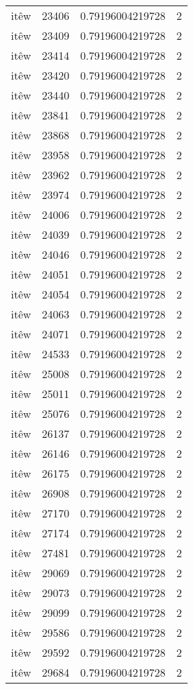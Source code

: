 \begin{longtable}{llll}
itêw & 23406 & 0.79196004219728 & 2\\
itêw & 23409 & 0.79196004219728 & 2\\
itêw & 23414 & 0.79196004219728 & 2\\
itêw & 23420 & 0.79196004219728 & 2\\
itêw & 23440 & 0.79196004219728 & 2\\
itêw & 23841 & 0.79196004219728 & 2\\
itêw & 23868 & 0.79196004219728 & 2\\
itêw & 23958 & 0.79196004219728 & 2\\
itêw & 23962 & 0.79196004219728 & 2\\
itêw & 23974 & 0.79196004219728 & 2\\
itêw & 24006 & 0.79196004219728 & 2\\
itêw & 24039 & 0.79196004219728 & 2\\
itêw & 24046 & 0.79196004219728 & 2\\
itêw & 24051 & 0.79196004219728 & 2\\
itêw & 24054 & 0.79196004219728 & 2\\
itêw & 24063 & 0.79196004219728 & 2\\
itêw & 24071 & 0.79196004219728 & 2\\
itêw & 24533 & 0.79196004219728 & 2\\
itêw & 25008 & 0.79196004219728 & 2\\
itêw & 25011 & 0.79196004219728 & 2\\
itêw & 25076 & 0.79196004219728 & 2\\
itêw & 26137 & 0.79196004219728 & 2\\
itêw & 26146 & 0.79196004219728 & 2\\
itêw & 26175 & 0.79196004219728 & 2\\
itêw & 26908 & 0.79196004219728 & 2\\
itêw & 27170 & 0.79196004219728 & 2\\
itêw & 27174 & 0.79196004219728 & 2\\
itêw & 27481 & 0.79196004219728 & 2\\
itêw & 29069 & 0.79196004219728 & 2\\
itêw & 29073 & 0.79196004219728 & 2\\
itêw & 29099 & 0.79196004219728 & 2\\
itêw & 29586 & 0.79196004219728 & 2\\
itêw & 29592 & 0.79196004219728 & 2\\
itêw & 29684 & 0.79196004219728 & 2\\

\end{longtable}
